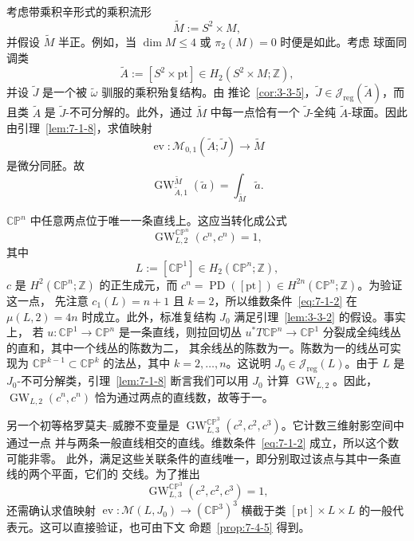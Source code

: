 \begin{example}\label{ex:7-1-13}
考虑带乘积辛形式的乘积流形
\[
  \widetilde M:=S^2\times M,
\]
并假设 $\widetilde M$ 半正。例如，当 $\dim M\le4$ 或 $\pi_2(M)=0$ 时便是如此。考虑
球面同调类
\[
  \widetilde A:=[S^2\times\mathrm{pt}]
  \in H_2(S^2\times M;\mathbb Z),
\]
并设 $\widetilde J$ 是一个被 $\widetilde\omega$ 驯服的乘积殆复结构。由
推论~\ref{cor:3-3-5}，$\widetilde J\in\mathcal J_{\mathrm{reg}}(\widetilde A)$，而且类
$\widetilde A$ 是 $\widetilde J$-不可分解的。此外，通过 $\widetilde M$ 中每一点恰有一个
$\widetilde J$-全纯 $\widetilde A$-球面。因此由引理~\ref{lem:7-1-8}，求值映射
\[
  \operatorname{ev}:\mathcal M_{0,1}(\widetilde A;\widetilde J)
  \longrightarrow\widetilde M
\]
是微分同胚。故
\[
  \operatorname{GW}^{\widetilde M}_{\widetilde A,1}(\widetilde a)
  =\int_{\widetilde M}\widetilde a.
\]
\end{example}

\begin{example}[射影空间中的直线]\label{ex:7-1-14}
$\mathbb{CP}^n$ 中任意两点位于唯一一条直线上。这应当转化成公式
\[
  \operatorname{GW}^{\mathbb{CP}^n}_{L,2}(c^n,c^n)=1,
\]
其中
\[
  L:=[\mathbb{CP}^1]\in H_2(\mathbb{CP}^n;\mathbb Z),
\]
$c$ 是 $H^2(\mathbb{CP}^n;\mathbb Z)$ 的正生成元，而
$c^n=\operatorname{PD}([\mathrm{pt}])\in H^{2n}(\mathbb{CP}^n;\mathbb Z)$。为验证这一点，
先注意 $c_1(L)=n+1$ 且 $k=2$，所以维数条件~\eqref{eq:7-1-2} 在
$\mu(L,2)=4n$ 时成立。此外，标准复结构 $J_0$ 满足引理~\ref{lem:3-3-2} 的假设。事实上，
若 $u:\mathbb{CP}^1\to\mathbb{CP}^n$ 是一条直线，则拉回切丛
$u^*T\mathbb{CP}^n\to\mathbb{CP}^1$ 分裂成全纯线丛的直和，其中一个线丛的陈数为二，
其余线丛的陈数为一。陈数为一的线丛可实现为
$\mathbb{CP}^{k-1}\subset\mathbb{CP}^k$ 的法丛，其中 $k=2,\ldots,n$。这说明
$J_0\in\mathcal J_{\mathrm{reg}}(L)$。由于 $L$ 是 $J_0$-不可分解类，引理~\ref{lem:7-1-8}
断言我们可以用 $J_0$ 计算 $\operatorname{GW}_{L,2}$。因此，
$\operatorname{GW}_{L,2}(c^n,c^n)$ 恰为通过两点的直线数，故等于一。

另一个初等格罗莫夫--威滕不变量是
$\operatorname{GW}^{\mathbb{CP}^3}_{L,3}(c^2,c^2,c^3)$。它计数三维射影空间中通过一点
并与两条一般直线相交的直线。维数条件~\eqref{eq:7-1-2} 成立，所以这个数可能非零。
此外，满足这些关联条件的直线唯一，即分别取过该点与其中一条直线的两个平面，它们的
交线。为了推出
\[
  \operatorname{GW}^{\mathbb{CP}^3}_{L,3}(c^2,c^2,c^3)=1,
\]
还需确认求值映射
$\operatorname{ev}:\mathcal M(L,J_0)\to(\mathbb{CP}^3)^3$ 横截于类
$[\mathrm{pt}]\times L\times L$ 的一般代表元。这可以直接验证，也可由下文
命题~\ref{prop:7-4-5} 得到。
\end{example}

